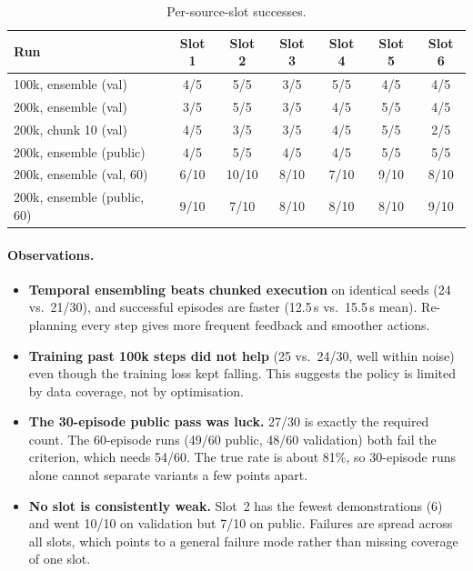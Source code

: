 \documentclass[11pt,a4paper]{article}
\begin{document}
\begin{table}[h]
\centering
\begin{tabular}{lcccccc}
\toprule
Run & Slot 1 & Slot 2 & Slot 3 & Slot 4 & Slot 5 & Slot 6 \\
\midrule
100k, ensemble (val) & 4/5 & 5/5 & 3/5 & 5/5 & 4/5 & 4/5 \\
200k, ensemble (val) & 3/5 & 5/5 & 3/5 & 4/5 & 5/5 & 4/5 \\
200k, chunk 10 (val) & 4/5 & 3/5 & 3/5 & 4/5 & 5/5 & 2/5 \\
200k, ensemble (public) & 4/5 & 5/5 & 4/5 & 4/5 & 5/5 & 5/5 \\
\midrule
200k, ensemble (val, 60) & 6/10 & 10/10 & 8/10 & 7/10 & 9/10 & 8/10 \\
200k, ensemble (public, 60) & 9/10 & 7/10 & 8/10 & 8/10 & 8/10 & 9/10 \\
\bottomrule
\end{tabular}
\caption{Per-source-slot successes.}
\label{tab:slots}
\end{table}

\paragraph{Observations.}
\begin{itemize}
  \item \textbf{Temporal ensembling beats chunked execution} on identical
        seeds (24 vs.\ 21/30), and successful episodes are faster
        (12.5\,s vs.\ 15.5\,s mean). Re-planning every step gives more frequent
        feedback and smoother actions.
  \item \textbf{Training past 100k steps did not help} (25 vs.\ 24/30, well
        within noise) even though the training loss kept falling. This
        suggests the policy is limited by data coverage, not by
        optimisation.
  \item \textbf{The 30-episode public pass was luck.} 27/30 is exactly the
        required count. The 60-episode runs (49/60 public, 48/60
        validation) both fail the criterion, which needs 54/60. The true rate is
        about 81\%, so 30-episode runs alone cannot separate variants a few
        points apart.
  \item \textbf{No slot is consistently weak.} Slot~2 has the fewest
        demonstrations (6) and went 10/10 on validation but 7/10 on public.
        Failures are spread across all slots, which points to a general
        failure mode rather than missing coverage of one slot.
\end{itemize}
\end{document}

